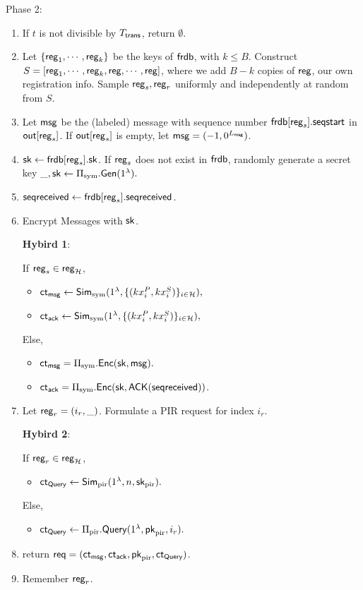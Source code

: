 Phase 2:
\begin{enumerate}
    \item If $t$ is not divisible by $T_{\mathsf{trans}}$, return $\emptyset$.
    \item Let $\{\mathsf{reg}_1, \cdots, \mathsf{reg}_k\}$ be the keys of $\mathsf{frdb}$, with $k\leq B$. Construct $S = [\mathsf{reg}_1,\cdots, \mathsf{reg}_k, \mathsf{reg}, \cdots, \mathsf{reg}]$, where we add $B - k$ copies of $\mathsf{reg}$, our own registration info. Sample $\mathsf{reg}_s, \mathsf{reg}_r$ uniformly and independently at random from $S$. 
    \item Let $\mathsf{msg}$ be the (labeled) message with sequence number $\mathsf{frdb}[\mathsf{reg}_s].\mathsf{seqstart}$ in $\mathsf{out}[\mathsf{reg}_s]$. If $\mathsf{out}[\mathsf{reg}_s]$ is empty, let $\mathsf{msg} = (-1, 0^{L_{\mathsf{msg}}})$.
    \item ${\mathsf{sk}} \leftarrow \mathsf{frdb}[\mathsf{reg}_s].{\mathsf{sk}}$. If $\mathsf{reg}_s$ does not exist in $\mathsf{frdb}$, randomly generate a secret key $\_, {\mathsf{sk}} \leftarrow \Pi_{\text{sym}}.\mathsf{Gen}(1^{\lambda}).$
    \item $\mathsf{seqreceived} \leftarrow \mathsf{frdb}[\mathsf{reg}_s].\mathsf{seqreceived}$.
    \item Encrypt Messages with ${\mathsf{sk}}$.
    
    {\color{red} 
    \textbf{Hybird 1}:
    
    If $\mathsf{reg}_s \in \mathsf{reg}_{\mathcal{H}}$, 
    \begin{itemize}
        \item $\mathsf{ct}_{\mathsf{msg}} \leftarrow \mathsf{Sim}_{\text{sym}}(1^{\lambda},\{(kx_i^P, kx_i^S)\}_{i \in \mathcal{H}}),$
        \item $\mathsf{ct}_{\mathsf{ack}} \leftarrow \mathsf{Sim}_{\text{sym}}(1^{\lambda},\{(kx_i^P, kx_i^S)\}_{i \in \mathcal{H}}),$
    \end{itemize}
    Else, 
    }
    
    
    \begin{itemize}
        \item $\mathsf{ct}_{\mathsf{msg}} = \Pi_{\text{sym}}.\mathsf{Enc}({\mathsf{sk}}, \mathsf{msg}).$
        \item $\mathsf{ct}_{\mathsf{ack}} = \Pi_{\text{sym}}.\mathsf{Enc}({\mathsf{sk}}, \mathsf{ACK}(\mathsf{seqreceived}))$.
    \end{itemize}
    \item Let $\mathsf{reg}_r = (i_r, \_)$. Formulate a PIR request for index $i_r$. 
    
     {
     \color{red}
          
     \textbf{Hybird 2}:
         
     If $\mathsf{reg}_r \in \mathsf{reg}_{\mathcal{H}}$, 
    \begin{itemize}
        \item $\mathsf{ct}_{\mathsf{Query}} \leftarrow \mathsf{Sim}_{\text{pir}}(1^{\lambda}, n, {\mathsf{sk}}_{\text{pir}}).$
    \end{itemize}
    Else, 
    }
    \begin{itemize}
        \item $\mathsf{ct}_{\mathsf{Query}} \leftarrow \Pi_{\text{pir}}.\mathsf{Query}(1^{\lambda}, \mathsf{pk}_{\text{pir}}, i_r).$
    \end{itemize}
    \item return $\mathsf{req} = (\mathsf{ct}_{\mathsf{msg}}, \mathsf{ct}_{\mathsf{ack}}, \mathsf{pk}_{\text{pir}}, \mathsf{ct}_{\mathsf{Query}})$.
    \item Remember $\mathsf{reg}_r$.
\end{enumerate}
